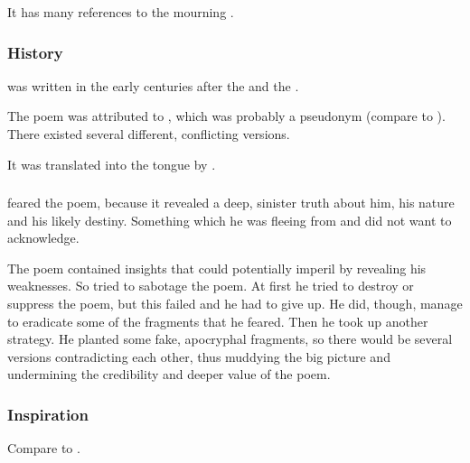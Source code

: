 It has many references to the mourning . 





\subsubsection{History}
\WanderersInDarknessEmph was written in the early centuries after the \secondbanewar and the \Shrouding. 

The poem was attributed to , which was probably a pseudonym (compare to ). 
There existed several different, conflicting versions. 

It was translated into the \resphan tongue by . 





\subsubsection{\Ishnaruchaefir}

\Ishnaruchaefir{} feared the poem, because it revealed a deep, sinister truth about him, his nature and his likely destiny. 
Something which he was fleeing from and did not want to acknowledge. 

The poem contained insights that could potentially imperil \Ishnaruchaefir by revealing his weaknesses. 
So \Ishnaruchaefir tried to sabotage the poem. 
At first he tried to destroy or suppress the poem, but this failed and he had to give up. 
He did, though, manage to eradicate some of the fragments that he feared. 
Then he took up another strategy. 
He planted some fake, apocryphal fragments, so there would be several versions contradicting each other, thus muddying the big picture and undermining the credibility and deeper value of the poem. 





\subsubsection{Inspiration}
Compare to \RWCTKIY.


